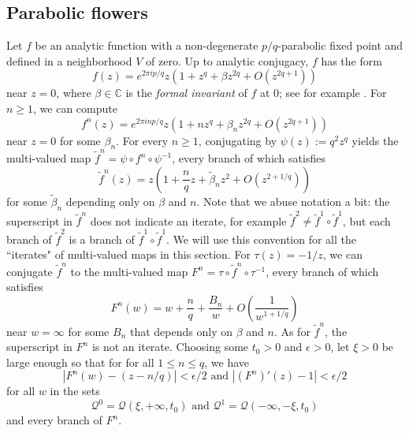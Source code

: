 \documentclass[12pt,letterpaper]{amsart}
\numberwithin{equation}{section}
\theoremstyle{remark}
\theoremstyle{definition}
\newcommand{\C}{\mathbb C}
\newcommand{\QQ}{\mathcal Q}
\begin{document}
	\subsection{Parabolic flowers}
	Let $f$ be an analytic function with a non-degenerate $p/q$-parabolic fixed point and defined in a neighborhood $V$ of zero.
	Up to analytic conjugacy, $f$ has the form 
	$$f(z)= e^{2\pi i p/q}z(1+z^{ q}+\beta z^{2 q}+O(z^{2 q + 1}))$$
	near $z=0$, 
	where $\beta\in \C$ is the \textit{formal invariant} of $f$ at $0$; see for example \cite[Appendix]{parabolic_PLY}. For $n\geq 1$, we can compute
	$$f^n(z) = e^{2\pi inp/q}z\left(1+nz^q+\beta_nz^{2q}+O(z^{2q+1})\right)$$
	near $z=0$ for some $\beta_n$.
	For every $n\geq 1$, conjugating by $\psi(z) :=q^2z^q$ yields the multi-valued map $\tilde{f}^n= \psi\circ f^n\circ \psi^{-1}$, every branch of which satisfies
	$$\tilde{f}^n(z) =  z\left(1+\frac{n}{q}z+\tilde{\beta}_nz^2+O(z^{2+1/q})\right)$$
	for some $\tilde{\beta}_n$ depending only on $\beta$ and $n$. 
	Note that we abuse notation a bit: the superscript in $\tilde{f}^n$ does not indicate an iterate, for example  $\tilde{f}^2\neq \tilde{f}^1\circ \tilde{f}^1$, but each branch of $\tilde{f}^2$ is a branch of $\tilde{f}^1\circ \tilde{f}^1$. We will use this convention for all the ``iterates" of multi-valued maps in this section.
	For $\tau(z) =-1/z$,
	we can conjugate $\tilde{f}^n$ to the multi-valued map ${F}^n= \tau\circ \tilde{f}^n\circ \tau^{-1}$, every branch of which satisfies 
	$${F}^n(w) = w+\frac{n}{q}+ \frac{{B}_n}{w}+ O\left(\frac{1}{w^{1+1/q}}\right)$$
	near $w=\infty$ for some ${B}_n$ that depends only on $\beta$ and $n$.
	As for $\tilde{f}^n$, the superscript in $F^n$ is not an iterate.
	Choosing some $t_0>0$ and $\epsilon>0$, let $\xi>0$ be large enough so that for for all $1\leq n \leq q$, we have
	$$|{F}^n(w) - (z-n/q)|< \epsilon/2 \text{ and }|({F}^n)'(z) - 1|< \epsilon/2$$
	for all $w$ in the sets
	$$\QQ^0 = \QQ(\xi, +\infty, t_0) \text{ and }\QQ^1= \QQ(-\infty, -\xi, t_0)$$
	and every branch of ${F}^n$.
	
\end{document}
